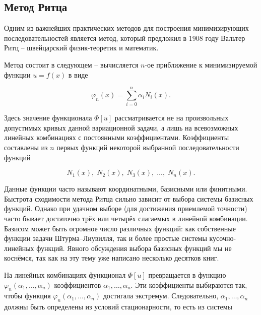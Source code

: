 \documentclass{article}
\begin{document}

\subsection{Метод Ритца}

Одним из важнейших практических методов для построения минимизирующих последовательностей является метод, который предложил в 1908 году Вальтер Ритц -- швейцарский физик-теоретик и математик.

Метод состоит в следующем -- вычисляется $n$-ое приближение к минимизируемой функции $u = f(x)$ в виде

\begin{equation}\label{approx_func}
	\varphi_{n}(x) = \sum_{i=0}^n \alpha_{i} N_{i}(x).
\end{equation}

\noindent Здесь значение функционала $\Phi[u]$ рассматривается не на произвольных допустимых кривых данной вариационной задачи, а лишь на всевозможных линейных комбинациях с постоянными коэффициентами. Коэффициенты составлены из $n$ первых функций некоторой выбранной последовательности функций

\begin{displaymath}
	N_{1}(x), \; N_{2}(x), \; N_{3}(x), \; \ldots, \; N_{n}(x).
\end{displaymath}

\begin{info}
	Данные функции часто называют координатными, базисными или финитными. Быстрота сходимости метода Ритца сильно зависит от выбора системы базисных функций. Однако при удачном выборе (для достижения приемлемой точности) часто бывает достаточно трёх или четырёх слагаемых в линейной комбинации. Базисом может быть огромное число различных функций: как собственные функции задачи Штурма--Лиувилля, так и более простые системы кусочно-линейных функций. Явного обсуждения выбора базисных функций мы не коснёмся, так как на эту тему уже написано несколько десятков книг.
\end{info}

На линейных комбинациях функционал $\Phi[u]$ превращается в функцию $\varphi_{n}(\alpha_{1}, \ldots, \alpha_{n})$ коэффициентов $\alpha_{1}, \ldots, \alpha_{n}$. Эти коэффициенты выбираются так, чтобы функция $\varphi_{n}(\alpha_{1}, \ldots, \alpha_{n})$ достигала экстремум. Следовательно, $\alpha_{1}, \ldots, \alpha_{n}$ должны быть определены из условий стационарности, то есть из системы
\end{document}
